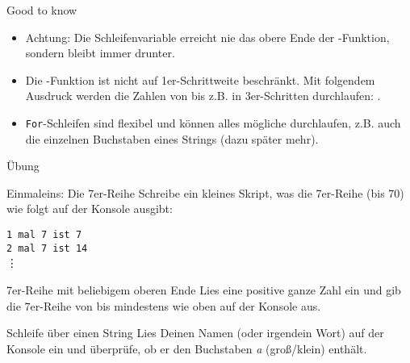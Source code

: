 \begin{frame}
\begin{block}{Good to know}
	\pause
	\begin{itemize}[<+->]
		\item Achtung: Die Schleifenvariable erreicht nie das obere Ende der -Funktion, sondern bleibt immer  drunter. 
		\item Die -Funktion ist nicht auf 1er-Schrittweite beschränkt. Mit folgendem Ausdruck werden die Zahlen von  bis  z.B. in 3er-Schritten durchlaufen: . 
		\item \texttt{For}-Schleifen sind flexibel und können alles mögliche durchlaufen, z.B. auch die einzelnen Buchstaben eines Strings (dazu später mehr).
	\end{itemize}
\end{block}
\end{frame}

\begin{frame}{Übung}

\begin{block}{Einmaleins: Die 7er-Reihe}
	\vspace{2pt}
Schreibe ein kleines Skript, was die 7er-Reihe (bis 70) wie folgt auf der Konsole ausgibt: 

\texttt{1 mal 7 ist 7}\\	
\texttt{2 mal 7 ist 14}\\
\phantom{4 mal} \vdots  

\end{block}

\vspace{12pt}

\pause 

\begin{block}{7er-Reihe mit beliebigem oberen Ende}
\vspace{2pt}
Lies eine positive ganze Zahl  ein und gib die 7er-Reihe von  bis mindestens  wie oben auf der Konsole aus.
\end{block}

\pause

\vspace{12pt}

\begin{block}{Schleife über einen String}
\vspace{2pt}
Lies Deinen Namen (oder irgendein Wort) auf der Konsole ein und überprüfe, ob er den Buchstaben \emph{a} (groß/klein) enthält. 
\end{block}
\end{frame}



